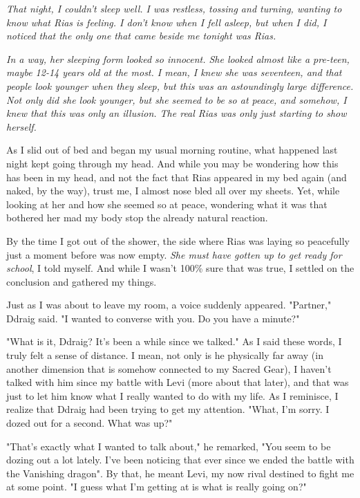 \documentclass{article}
\begin{document}
\emph{That night, I couldn't sleep well. I was restless, tossing and turning, wanting to know what Rias is feeling. I don't know when I fell asleep, but when I did, I noticed that the only one that came beside me tonight was Rias.}

\emph{In a way, her sleeping form looked so innocent. She looked almost like a pre-teen, maybe 12-14 years old at the most. I mean, I knew she was seventeen, and that people look younger when they sleep, but this was an astoundingly large difference. Not only did she look younger, but she seemed to be so at peace, and somehow, I knew that this was only an illusion. The real Rias was only just starting to show herself.}

As I slid out of bed and began my usual morning routine, what happened last night kept going through my head. And while you may be wondering how this has been in my head, and not the fact that Rias appeared in my bed again (and naked, by the way), trust me, I almost nose bled all over my sheets. Yet, while looking at her and how she seemed so at peace, wondering what it was that bothered her mad my body stop the already natural reaction.

By the time I got out of the shower, the side where Rias was laying so peacefully just a moment before was now empty. \emph{She must have gotten up to get ready for school}, I told myself. And while I wasn't 100\% sure that was true, I settled on the conclusion and gathered my things.

Just as I was about to leave my room, a voice suddenly appeared. "Partner," Ddraig said. "I wanted to converse with you. Do you have a minute?"

"What is it, Ddraig? It's been a while since we talked." As I said these words, I truly felt a sense of distance. I mean, not only is he physically far away (in another dimension that is somehow connected to my Sacred Gear), I haven't talked with him since my battle with Levi (more about that later), and that was just to let him know what I really wanted to do with my life. As I reminisce, I realize that Ddraig had been trying to get my attention. "What, I'm sorry. I dozed out for a second. What was up?"

"That's exactly what I wanted to talk about," he remarked, "You seem to be dozing out a lot lately. I've been noticing that ever since we ended the battle with the Vanishing dragon". By that, he meant Levi, my now rival destined to fight me at some point. "I guess what I'm getting at is what is really going on?"
\end{document}
